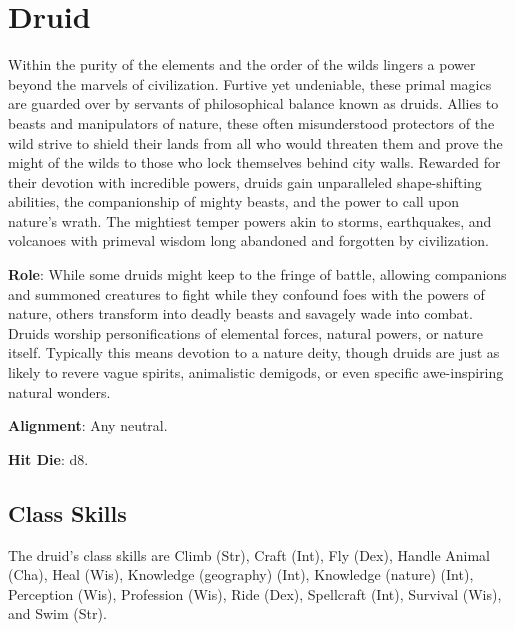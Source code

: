 \section{Druid}

\label{f0}				
Within the purity of the elements and the order of the wilds lingers a power beyond the marvels of civilization. Furtive yet undeniable, these primal magics are guarded over by servants of philosophical balance known as druids. Allies to beasts and manipulators of nature, these often misunderstood protectors of the wild strive to shield their lands from all who would threaten them and prove the might of the wilds to those who lock themselves behind city walls. Rewarded for their devotion with incredible powers, druids gain unparalleled shape-shifting abilities, the companionship of mighty beasts, and the power to call upon nature's wrath. The mightiest temper powers akin to storms, earthquakes, and volcanoes with primeval wisdom long abandoned and forgotten by civilization. 
				
\textbf{Role}: While some druids might keep to the fringe of battle, allowing companions and summoned creatures to fight while they confound foes with the powers of nature, others transform into deadly beasts and savagely wade into combat. Druids worship personifications of elemental forces, natural powers, or nature itself. Typically this means devotion to a nature deity, though druids are just as likely to revere vague spirits, animalistic demigods, or even specific awe-inspiring natural wonders.
				
\textbf{Alignment}: Any neutral.
				
\textbf{Hit Die}: d8.
				
\subsection{Class Skills}

				
The druid's class skills are Climb (Str), Craft (Int), Fly (Dex), Handle Animal (Cha), Heal (Wis), Knowledge (geography) (Int), Knowledge (nature) (Int), Perception (Wis), Profession (Wis), Ride (Dex), Spellcraft (Int), Survival (Wis), and Swim (Str).
				
